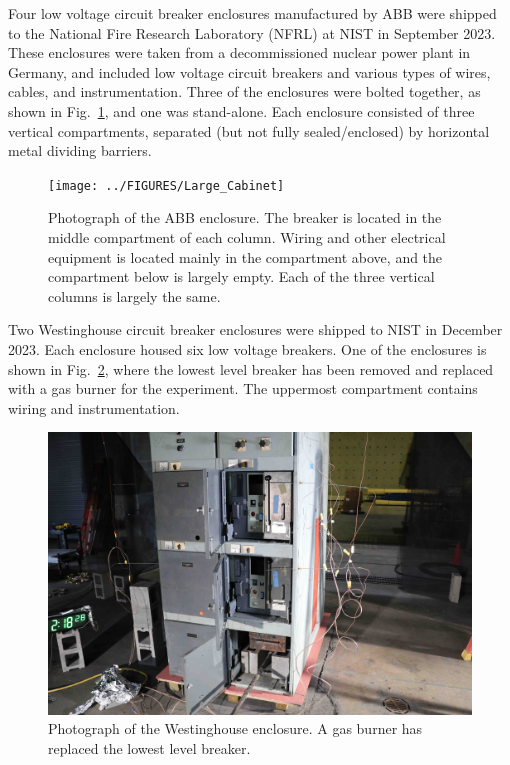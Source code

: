Four low voltage circuit breaker enclosures manufactured by ABB were shipped to the National Fire Research Laboratory (NFRL) at NIST in September 2023. These enclosures were taken from a decommissioned nuclear power plant in Germany, and included low voltage circuit breakers and various types of wires, cables, and instrumentation. Three of the enclosures were bolted together, as shown in Fig.~\ref{fig:Cabinet_1}, and one was stand-alone. Each enclosure consisted of three vertical compartments, separated (but not fully sealed/enclosed) by horizontal metal dividing barriers.

\begin{figure}[ht]
\centering
\texttt{[image: ../FIGURES/Large\_Cabinet]}
\caption[Photograph of ABB enclosure] {Photograph of the ABB enclosure. The breaker is located in the middle compartment of each column. Wiring and other electrical equipment is located mainly in the compartment above, and the compartment below is largely empty. Each of the three vertical columns is largely the same.}
\label{fig:Cabinet_1}
\end{figure}

Two Westinghouse circuit breaker enclosures were shipped to NIST in December 2023. Each enclosure housed six low voltage breakers. One of the enclosures is shown in Fig.~\ref{fig:Cabinet_2}, where the lowest level breaker has been removed and replaced with a gas burner for the experiment. The uppermost compartment contains wiring and instrumentation.

\begin{figure}[ht]
\centering
\includegraphics[width=6.5in]{../FIGURES/Westinghouse}
\caption[Photograph of Westinghouse enclosure] {Photograph of the Westinghouse enclosure. A gas burner has replaced the lowest level breaker.}
\label{fig:Cabinet_2}
\end{figure}

